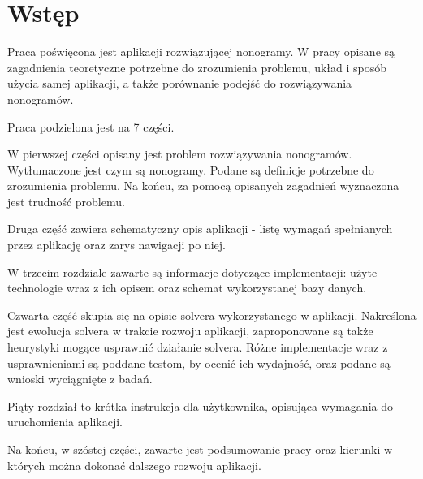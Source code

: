 \chapter*{Wstęp}

\thispagestyle{chapterBeginStyle}



	Praca poświęcona jest aplikacji rozwiązującej nonogramy. W pracy opisane są zagadnienia
teoretyczne potrzebne do zrozumienia problemu, układ i sposób użycia samej aplikacji, a także
porównanie podejść do rozwiązywania nonogramów.

	Praca podzielona jest na 7 części.

	W pierwszej części opisany jest problem rozwiązywania nonogramów. Wytłumaczone jest
czym są nonogramy. Podane są definicje potrzebne do zrozumienia problemu. Na końcu, za pomocą
opisanych zagadnień wyznaczona jest trudność problemu.

	Druga część zawiera schematyczny opis aplikacji - listę wymagań spełnianych przez
aplikację oraz zarys nawigacji po niej.

	W trzecim rozdziale zawarte są informacje dotyczące implementacji: użyte technologie wraz
z ich opisem oraz schemat wykorzystanej bazy danych.

	Czwarta część skupia się na opisie solvera wykorzystanego w aplikacji. Nakreślona jest ewolucja
solvera w trakcie rozwoju aplikacji, zaproponowane są także heurystyki mogące usprawnić działanie
solvera. Różne implementacje wraz z usprawnieniami są poddane testom, by ocenić ich wydajność,
oraz podane są wnioski wyciągnięte z badań.

	Piąty rozdział to krótka instrukcja dla użytkownika, opisująca wymagania do uruchomienia aplikacji.

	Na końcu, w szóstej części, zawarte jest podsumowanie pracy oraz kierunki w których
można dokonać dalszego rozwoju aplikacji.
